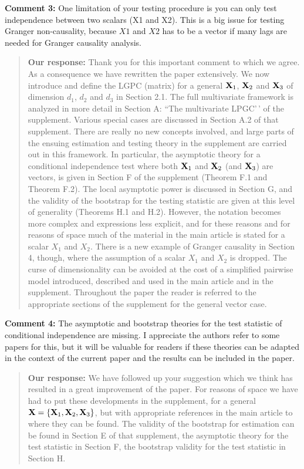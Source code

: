 \documentclass[
  12pt,
  letterpaper]{article}
\numberwithin{equation}{section}
\begin{document}
\textbf{Comment 3:} One limitation of your testing procedure is you can only test independence between two scalars (X1 and X2). This is a big issue for testing Granger non-causality, because \(X1\) and \(X2\) has to be a vector if many lags are needed for Granger causality analysis.

\begin{quote}
\textbf{Our response:} Thank you for this important comment to which we agree. As a consequence we have rewritten the paper extensively. We now introduce and define the LGPC (matrix) for a general \({\bf X}_1\), \({\bf X}_2\) and \({\bf X}_3\) of dimension \(d_1\), \(d_2\) and \(d_3\) in Section 2.1. The full multivariate framework is analyzed in more detail in Section A: ``The multivariate LPGC'\,' of the supplement. Various special cases are discussed in Section A.2 of that supplement. There are really no new concepts involved, and large parts of the ensuing estimation and testing theory in the supplement are carried out in this framework. In particular, the asymptotic theory for a conditional independence test where both \({\bf X}_1\) and \({\bf X}_2\) (and \({\bf X}_3\)) are vectors, is given in Section F of the supplement (Theorem F.1 and Theorem F.2). The local asymptotic power is discussed in Section G, and the validity of the bootstrap for the testing statistic are given at this level of generality (Theorems H.1 and H.2). However, the notation becomes more complex and expressions less explicit, and for these reasons and for reasons of space much of the material in the main article is stated for a scalar \(X_1\) and \(X_2\). There is a new example of Granger causality in Section 4, though, where the assumption of a scalar \(X_1\) and \(X_2\) is dropped. The curse of dimensionality can be avoided at the cost of a simplified pairwise model introduced, described and used in the main article and in the supplement. Throughout the paper the reader is referred to the appropriate sections of the supplement for the general vector case.
\end{quote}

\textbf{Comment 4:} The asymptotic and bootstrap theories for the test statistic of conditional independence are missing. I appreciate the authors refer to some papers for this, but it will be valuable for readers if these theories can be adapted in the context of the current paper and the results can be included in the paper.

\begin{quote}
\textbf{Our response:} We have followed up your suggestion which we think has resulted in a great improvement of the paper. For reasons of space we have had to put these developments in the supplement, for a general \({\bf X} = \{{\bf X}_1,{\bf X}_2, {\bf X}_3\}\), but with appropriate references in the main article to where they can be found. The validity of the bootstrap for estimation can be found in Section E of that supplement, the asymptotic theory for the test statistic in Section F, the bootstrap validity for the test statistic in Section H.
\end{quote}
\end{document}
